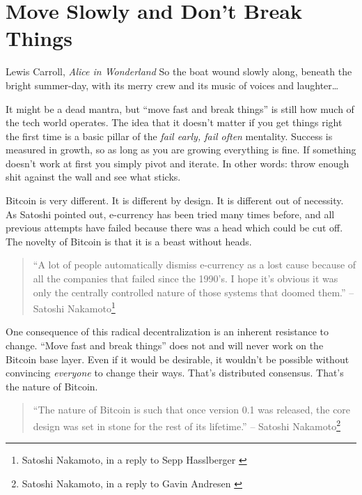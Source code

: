 \chapter{Move Slowly and Don't Break Things}
\label{les:18}

\begin{chapquote}{Lewis Carroll, \textit{Alice in Wonderland}}
So the boat wound slowly along, beneath the bright summer-day, with its merry crew and its music of voices and laughter\ldots
\end{chapquote}

It might be a dead mantra, but \enquote{move fast and break things} is still how
much of the tech world operates. The idea that it doesn't matter if you
get things right the first time is a basic pillar of the \textit{fail early,
fail often} mentality. Success is measured in growth, so as long as you
are growing everything is fine. If something doesn't work at first you
simply pivot and iterate. In other words: throw enough shit against the
wall and see what sticks.

Bitcoin is very different. It is different by design. It is different
out of necessity. As Satoshi pointed out, e-currency has been tried
many times before, and all previous attempts have failed because there
was a head which could be cut off. The novelty of Bitcoin is that it is
a beast without heads.

\begin{quotation}
\enquote{A lot of people automatically dismiss e-currency as a lost cause
because of all the companies that failed since the 1990's. I hope it's
obvious it was only the centrally controlled nature of those systems
that doomed them.}
\flushright -- Satoshi Nakamoto\footnote{Satoshi Nakamoto, in a reply to Sepp Hasslberger \cite{satoshi-centralized-nature}}
\end{quotation}

One consequence of this radical decentralization is an inherent
resistance to change. \enquote{Move fast and break things} does not and will
never work on the Bitcoin base layer. Even if it would be desirable, it
wouldn't be possible without convincing \textit{everyone} to change their ways.
That's distributed consensus. That's the nature of Bitcoin.

\begin{quotation}
\enquote{The nature of Bitcoin is such that once version 0.1 was released, the
core design was set in stone for the rest of its lifetime.}
\flushright -- Satoshi Nakamoto\footnote{Satoshi Nakamoto, in a reply to Gavin Andresen \cite{satoshi-centralized-nature}}
\end{quotation}

